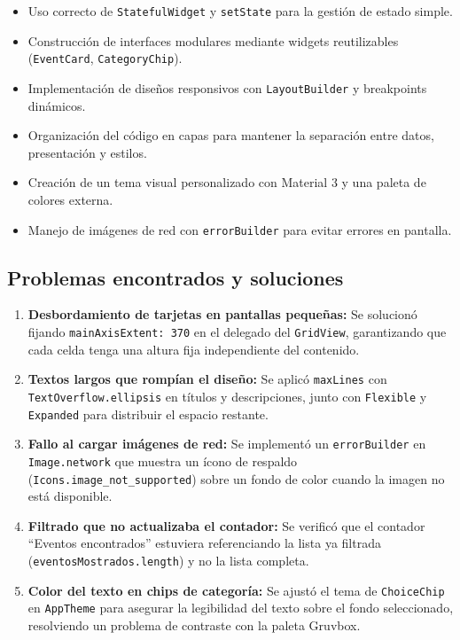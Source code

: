 \documentclass[12pt, a4paper]{article}
\begin{document}
\begin{itemize}[noitemsep]
    \item Uso correcto de \texttt{StatefulWidget} y \texttt{setState} para la gestión de estado simple.
    \item Construcción de interfaces modulares mediante widgets reutilizables (\texttt{EventCard}, \texttt{CategoryChip}).
    \item Implementación de diseños responsivos con \texttt{LayoutBuilder} y breakpoints dinámicos.
    \item Organización del código en capas para mantener la separación entre datos, presentación y estilos.
    \item Creación de un tema visual personalizado con Material 3 y una paleta de colores externa.
    \item Manejo de imágenes de red con \texttt{errorBuilder} para evitar errores en pantalla.
\end{itemize}

\subsection{Problemas encontrados y soluciones}

\begin{enumerate}[noitemsep]
    \item \textbf{Desbordamiento de tarjetas en pantallas pequeñas:} Se solucionó fijando \texttt{mainAxisExtent: 370} en el delegado del \texttt{GridView}, garantizando que cada celda tenga una altura fija independiente del contenido.

    \item \textbf{Textos largos que rompían el diseño:} Se aplicó \texttt{maxLines} con \texttt{TextOverflow.ellipsis} en títulos y descripciones, junto con \texttt{Flexible} y \texttt{Expanded} para distribuir el espacio restante.

    \item \textbf{Fallo al cargar imágenes de red:} Se implementó un \texttt{errorBuilder} en \texttt{Image.network} que muestra un ícono de respaldo (\texttt{Icons.image\_not\_supported}) sobre un fondo de color cuando la imagen no está disponible.

    \item \textbf{Filtrado que no actualizaba el contador:} Se verificó que el contador ``Eventos encontrados'' estuviera referenciando la lista ya filtrada (\texttt{eventosMostrados.length}) y no la lista completa.

    \item \textbf{Color del texto en chips de categoría:} Se ajustó el tema de \texttt{ChoiceChip} en \texttt{AppTheme} para asegurar la legibilidad del texto sobre el fondo seleccionado, resolviendo un problema de contraste con la paleta Gruvbox.
\end{enumerate}
\end{document}
